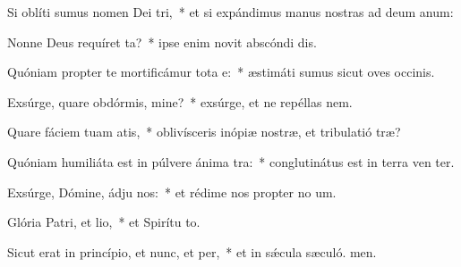 \item Si oblíti sumus nomen Dei tri,~* et si expándimus manus nostras ad deum anum:
\item Nonne Deus requíret ta?~* ipse enim novit abscóndi dis.
\item Quóniam propter te mortificámur tota e:~* æstimáti sumus sicut oves occinis.
\item Exsúrge, quare obdórmis, mine?~* exsúrge, et ne repéllas  nem.
\item Quare fáciem tuam atis,~* oblivísceris inópiæ nostræ, et tribulatió træ?
\item Quóniam humiliáta est in púlvere ánima tra:~* conglutinátus est in terra ven ter.
\item Exsúrge, Dómine, ádju nos:~* et rédime nos propter no um.
\item Glória Patri, et lio,~* et Spirítu to.
\item Sicut erat in princípio, et nunc, et per,~* et in sǽcula sæculó. men.
